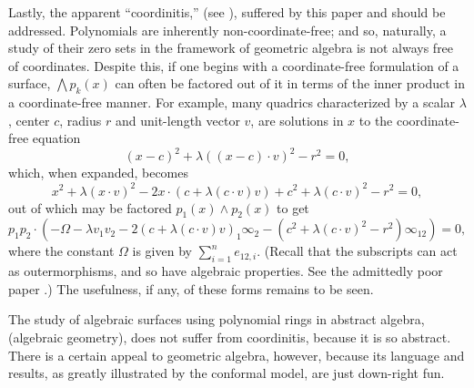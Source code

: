 \documentclass{birkjour}
\theoremstyle{definition}
\theoremstyle{remark}
\numberwithin{equation}{section}
\newcommand{\nvai}{\infty}
\begin{document}
Lastly, the apparent ``coordinitis,'' (see \cite{Hestenes92}), suffered by this paper and \cite{Parkin13} should
be addressed.  Polynomials are inherently non-coordinate-free; and so, naturally, a study of their zero sets
in the framework of geometric algebra is not always free of coordinates.  Despite this,
if one begins with a coordinate-free formulation of a surface, $\bigwedge p_k(x)$ can often be
factored out of it in terms of the inner product in a coordinate-free manner.  For example, many quadrics
characterized by a scalar $\lambda$, center $c$, radius $r$ and unit-length vector $v$, are solutions in $x$ to the
coordinate-free equation
\begin{equation*}
(x-c)^2+\lambda((x-c)\cdot v)^2 - r^2 = 0,
\end{equation*}
which, when expanded, becomes
\begin{equation*}
x^2+\lambda (x\cdot v)^2 - 2x\cdot (c+\lambda (c\cdot v)v)+c^2+\lambda(c\cdot v)^2 - r^2 = 0,
\end{equation*}
out of which may be factored $p_1(x)\wedge p_2(x)$ to get
\begin{equation*}
p_1p_2\cdot(-\Omega-\lambda v_1v_2-2(c+\lambda(c\cdot v)v)_1\nvai_2-(c^2+\lambda (c\cdot v)^2-r^2)\nvai_{12})=0,
\end{equation*}
where the constant $\Omega$ is given by $\sum_{i=1}^n e_{12,i}$.
(Recall that the subscripts can act as outermorphisms, and so have algebraic properties.  See the
admittedly poor paper \cite{Parkin13_2}.)
The usefulness, if any, of these forms remains to be seen.

The study of algebraic surfaces using polynomial rings in abstract algebra, (algebraic geometry),
does not suffer from coordinitis, because it is so abstract.  There is a certain appeal to geometric algebra,
however, because its language and results, as greatly illustrated by the conformal model, are just down-right fun.
\end{document}
